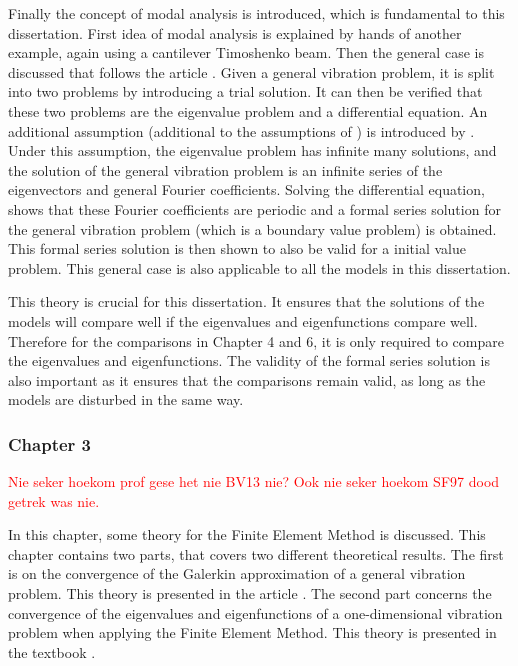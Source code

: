 \documentclass[../main.tex]{subfiles}
\begin{document}
Finally the concept of modal analysis is introduced, which is fundamental to this dissertation. First idea of modal analysis is explained by hands of another example, again using a cantilever Timoshenko beam. Then the general case is discussed that follows the article \cite{CVV18}. Given a general vibration problem, it is split into two problems by introducing a trial solution. It can then be verified that these two problems are the eigenvalue problem and a differential equation. An additional assumption (additional to the assumptions of \cite{VV02}) is introduced by \cite{CVV18}. Under this assumption, the eigenvalue problem has infinite many solutions, and the solution of the general vibration problem is an infinite series of the eigenvectors and general Fourier coefficients. Solving the differential equation, shows that these Fourier coefficients are periodic and a formal series solution for the general vibration problem (which is a boundary value problem) is obtained. This formal series solution is then shown to also be valid for a initial value problem. This general case is also applicable to all the models in this dissertation.

This theory is crucial for this dissertation. It ensures that the solutions of the models will compare well if the eigenvalues and eigenfunctions compare well. Therefore for the comparisons in Chapter 4 and 6, it is only required to compare the eigenvalues and eigenfunctions. The validity of the formal series solution is also important as it ensures that the comparisons remain valid, as long as the models are disturbed in the same way.

\subsubsection{Chapter 3}
\textcolor{red}{Nie seker hoekom prof gese het nie BV13 nie? Ook nie seker hoekom SF97 dood getrek was nie.}

In this chapter, some theory for the Finite Element Method is discussed. This chapter contains two parts, that covers two different theoretical results. The first is on the convergence of the Galerkin approximation of a general vibration problem. This theory is presented in the article \cite{BV13}. The second part concerns the convergence of the eigenvalues and eigenfunctions of a one-dimensional vibration problem when applying the Finite Element Method. This theory is presented in the textbook \cite{SF97}. 
\end{document}
